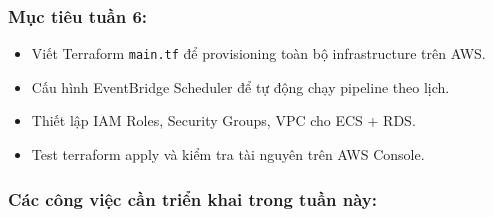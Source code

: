 \hypertarget{mux1ee5c-tiuxeau-tuux1ea7n-6}{%
\subsubsection{Mục tiêu tuần 6:}}

\begin{itemize}
\tightlist
\item
  Viết Terraform \texttt{main.tf} để provisioning toàn bộ infrastructure
  trên AWS.
\item
  Cấu hình EventBridge Scheduler để tự động chạy pipeline theo lịch.
\item
  Thiết lập IAM Roles, Security Groups, VPC cho ECS + RDS.
\item
  Test terraform apply và kiểm tra tài nguyên trên AWS Console.
\end{itemize}

\hypertarget{cuxe1c-cuxf4ng-viux1ec7c-cux1ea7n-triux1ec3n-khai-trong-tuux1ea7n-nuxe0y}{%
\subsubsection{Các công việc cần triển khai trong tuần
này:}}

